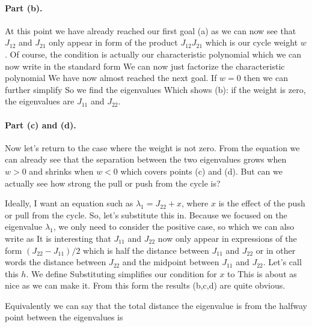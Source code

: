 \paragraph{Part (b).}At this point we have already reached our first goal (a) as we can now see that $J_{12}$ and $J_{21}$ only appear in form of the product $J_{12}J_{21}$ which is our cycle weight $w$. Of course, the condition is actually our characteristic polynomial which we can now write in the standard form 
We can now just factorize the characteristic polynomial 
We have now almost reached the next goal. If $w=0$ then we can further simplify 
So we find the eigenvalues 
Which shows (b): if the weight is zero, the eigenvalues are $J_{11}$ and $J_{22}$. 

\paragraph{Part (c) and (d).}Now let's return to the case where the weight is not zero. From the equation 
we can already see that the separation between the two eigenvalues grows when $w>0$ and shrinks when $w<0$ which covers points (c) and (d). But can we actually see how strong the pull or push from the cycle is? 

Ideally, I want an equation such as $\lambda_1 = J_{22} + x$, where $x$ is the effect of the push or pull from the cycle. So, let's substitute this in. Because we focused on the eigenvalue $\lambda_1$, we only need to consider the positive case, so 
which we can also write as 
It is interesting that $J_{11}$ and $J_{22}$ now only appear in expressions of the form $(J_{22}-J_{11})/2$ which is half the distance between $J_{11}$ and $J_{22}$ or in other words the distance between $J_{22}$ and the midpoint between $J_{11}$ and $J_{22}$. Let's call this $h$. We define
Substituting simplifies our condition for $x$ to 
This is about as nice as we can make it. From this form the results (b,c,d) are quite obvious. 

Equivalently we can say that the total distance the eigenvalue is from the halfway point between the eigenvalues is 
